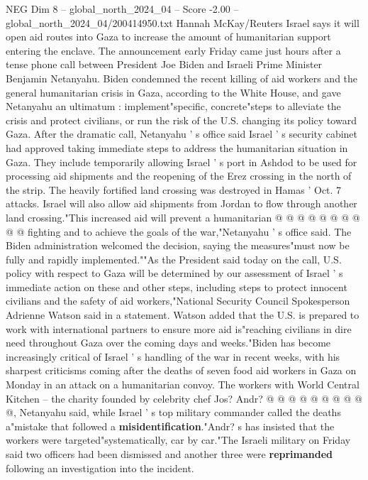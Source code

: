 \begin{textsample}{NEG Dim 8 – global\_north\_2024\_04 – Score -2.00 – global\_north\_2024\_04/200414950.txt}  \label{ex:f8_neg_133}
Hannah McKay/Reuters Israel says it will open aid routes into Gaza to increase the amount of humanitarian support entering the enclave.
The announcement early Friday came just hours after a tense phone call between President Joe Biden and Israeli Prime Minister Benjamin Netanyahu.
Biden condemned the recent killing of aid workers and the general humanitarian crisis in Gaza, according to the White House, and gave Netanyahu an ultimatum : implement"specific, concrete"steps to alleviate the crisis and protect civilians, or run the risk of the U.S. changing its policy toward Gaza.
After the dramatic call, Netanyahu ' s office said Israel ' s security cabinet had approved taking immediate steps to address the humanitarian situation in Gaza.
They include temporarily allowing Israel ' s port in Ashdod to be used for processing aid shipments and the reopening of the Erez crossing in the north of the strip.
The heavily fortified land crossing was destroyed in Hamas ' Oct. 7 attacks.
Israel will also allow aid shipments from Jordan to flow through another land crossing."This increased aid will prevent a humanitarian @ @ @ @ @ @ @ @ @ @ fighting and to achieve the goals of the war,"Netanyahu ' s office said.
The Biden administration welcomed the decision, saying the measures"must now be fully and rapidly implemented.""As the President said today on the call, U.S. policy with respect to Gaza will be determined by our assessment of Israel ' s immediate action on these and other steps, including steps to protect innocent civilians and the safety of aid workers,"National Security Council Spokesperson Adrienne Watson said in a statement.
Watson added that the U.S. is prepared to work with international partners to ensure more aid is"reaching civilians in dire need throughout Gaza over the coming days and weeks."Biden has become increasingly critical of Israel ' s handling of the war in recent weeks, with his sharpest criticisms coming after the deaths of seven food aid workers in Gaza on Monday in an attack on a humanitarian convoy.
The workers with World Central Kitchen -- the charity founded by celebrity chef Jos?
Andr? @ @ @ @ @ @ @ @ @ @, Netanyahu said, while Israel ' s top military commander called the deaths a"mistake that followed a \textbf{misidentification}."Andr? s has insisted that the workers were targeted"systematically, car by car."The Israeli military on Friday said two officers had been dismissed and another three were \textbf{reprimanded} following an investigation into the incident.

\end{textsample}
